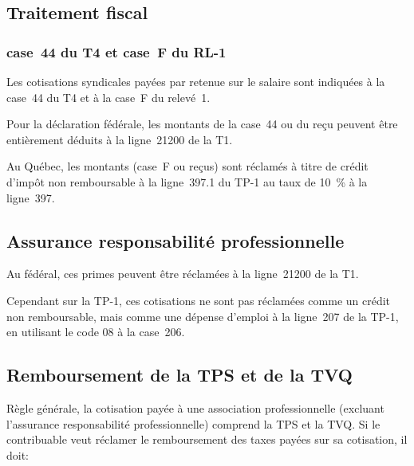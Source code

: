 \subsection{Traitement fiscal}
\subsubsection{case~44 du T4 et case~F du RL-1}
Les cotisations syndicales payées par retenue sur le salaire sont indiquées à la case~44 du T4 et à la case~F du relevé~1. 

Pour la déclaration fédérale, les montants de la case~44 ou du reçu peuvent être entièrement déduits à la ligne~21200 de la T1. 

Au Québec, les montants (case~F ou reçus) sont réclamés à titre de crédit d'impôt non remboursable à la ligne~397.1 du TP-1 au taux de 10~\% à la ligne~397.

\subsection{Assurance responsabilité professionnelle}
Au fédéral, ces primes peuvent être réclamées à la ligne~21200 de la T1. 

Cependant sur la TP-1, ces cotisations ne sont pas réclamées comme un crédit non remboursable, mais comme une dépense d'emploi à la ligne~207 de la TP-1, en utilisant le code 08 à la case~206.

\subsection{Remboursement de la TPS et de la TVQ}
Règle générale, la cotisation payée à une association professionnelle (excluant l'assurance responsabilité professionnelle) comprend la TPS et la TVQ. Si le contribuable veut réclamer le remboursement des taxes payées sur sa cotisation, il doit:

